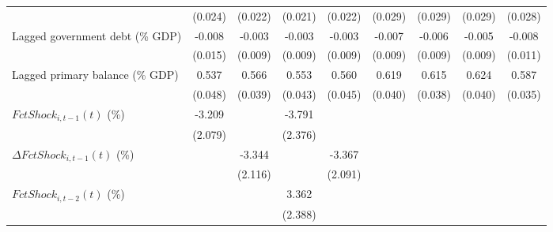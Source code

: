 {\begin{tabular}{l*{8}{c}}
                    &     (0.024)         &     (0.022)         &     (0.021)         &     (0.022)         &     (0.029)         &     (0.029)         &     (0.029)         &     (0.028)         \\
\addlinespace
Lagged government debt (\% GDP)&      -0.008         &      -0.003         &      -0.003         &      -0.003         &      -0.007         &      -0.006         &      -0.005         &      -0.008         \\
                    &     (0.015)         &     (0.009)         &     (0.009)         &     (0.009)         &     (0.009)         &     (0.009)         &     (0.009)         &     (0.011)         \\
\addlinespace
Lagged primary balance (\% GDP)&       0.537\sym{***}&       0.566\sym{***}&       0.553\sym{***}&       0.560\sym{***}&       0.619\sym{***}&       0.615\sym{***}&       0.624\sym{***}&       0.587\sym{***}\\
                    &     (0.048)         &     (0.039)         &     (0.043)         &     (0.045)         &     (0.040)         &     (0.038)         &     (0.040)         &     (0.035)         \\
\addlinespace
$ FctShock_{i,t-1}(t)$ (\%)&      -3.209         &                     &      -3.791         &                     &                     &                     &                     &                     \\
                    &     (2.079)         &                     &     (2.376)         &                     &                     &                     &                     &                     \\
\addlinespace
$ \Delta FctShock_{i,t-1}(t)$ (\%)&                     &      -3.344         &                     &      -3.367         &                     &                     &                     &                     \\
                    &                     &     (2.116)         &                     &     (2.091)         &                     &                     &                     &                     \\
\addlinespace
$ FctShock_{i,t-2}(t)$ (\%)&                     &                     &       3.362         &                     &                     &                     &                     &                     \\
                    &                     &                     &     (2.388)         &                     &                     &                     &                     &                     \\

\end{tabular}}
